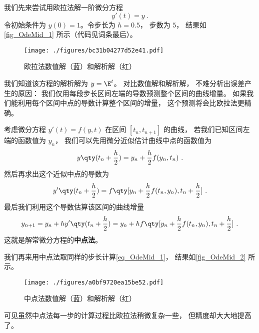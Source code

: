 

我们先来尝试用欧拉法解一阶微分方程
\begin{equation}\label{eq_OdeMid_1}
y'(t) = y~.
\end{equation}
令初始条件为 $y(0) = 1$。令步长为 $h = 0.5$， 步数为 $5$， 结果如\autoref{fig_OdeMid_1} 所示（代码见词条最后）。

\begin{figure}[ht]
\centering
\texttt{[image: ./figures/bc31b04277d52e41.pdf]}
\caption{欧拉法数值解（蓝）和解析解（红）} \label{fig_OdeMid_1}
\end{figure}

我们知道该方程的解析解为 $y = \E^{t}$。 对比数值解和解析解， 不难分析出误差产生的原因： 我们仅用每段步长区间左端的导数预测整个区间的曲线增量。 如果我们能利用每个区间中点的导数计算整个区间的增量， 这个预测将会比欧拉法更精确。

考虑微分方程 $y'(t) = f(y, t)$ 在区间 $[t_n, t_{n+1}]$ 的曲线， 若我们已知区间左端的函数值为 $y_n$， 我们可以先用微分近似估计曲线中点的函数值为
\begin{equation}
y \qty(t_n + \frac h2) = y_n + \frac h2 f(y_n, t_n)~.
\end{equation}
然后再求出这个近似中点的导数为
\begin{equation}
y' \qty(t_n + \frac h2) = f \qty[y_n + \frac h2 f(t_n, y_n), t_n + \frac h2]~.
\end{equation}
最后我们利用这个导数估算该区间的曲线增量
\begin{equation}
y_{n+1} = y_n + hy' \qty(t_n + \frac h2) = y_n + h f \qty[y_n + \frac h2 f(t_n, y_n), t_n + \frac h2]~.
\end{equation}
这就是解常微分方程的\textbf{中点法}。

我们再来用中点法取同样的步长计算\autoref{eq_OdeMid_1}， 结果如\autoref{fig_OdeMid_2} 所示。

\begin{figure}[ht]
\centering
\texttt{[image: ./figures/a0bf9720ea15be52.pdf]}
\caption{中点法数值解（蓝）和解析解（红）} \label{fig_OdeMid_2}
\end{figure}

可见虽然中点法每一步的计算过程比欧拉法稍微复杂一些， 但精度却大大地提高了。 


